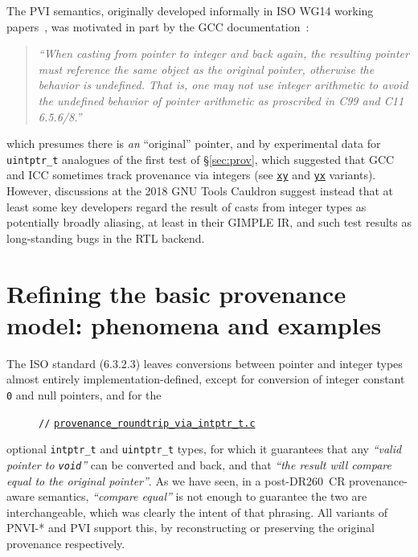 \documentclass[acmsmall,review,screen]{acmart}\settopmatter{printfolios=true,printccs=false,printacmref=false}
\newcommand{\myparagraph}[1]{\vspace{0.5\baselineskip}\par\noindent{\normalsize\bfseries{#1}}\quad}
\newcommand{\mytesturl}[1]{https://cerberus.cl.cam.ac.uk/cerberus?defacto/#1}
\newcommand{\mytestlink}[2]{\href{\mytesturl{#1}}{#2}}
\newcommand{\mylsttestlink}[1]{\mytestlink{#1}{\lstinline{#1}}}
\newcommand{\mylistingmargin}{5mm}
\newcommand{\myfooexamplename}[1]{\mylsttestlink{#1}}
\newcommand{\myfooexample}[3]{{\vspace*{-0.5\baselineskip}\par{\noindent\small\hspace*{\mylistingmargin}\lstinline{//} \mylsttestlink{#2}\vspace*{0.25\baselineskip}\par}}}
\begin{document}
The PVI semantics, originally developed
informally in ISO WG14 working papers~\cite{N2090,N2263}, 
was motivated in part by 
the GCC documentation~\cite{gcc-arrays}:
\begin{quote}
\emph{``When casting from pointer to integer and back again, the
    resulting pointer must reference the same object as the original
    pointer, otherwise the behavior is undefined. That is, one may
    not use integer arithmetic to avoid the undefined behavior of
    pointer arithmetic as proscribed in C99 and C11 6.5.6/8.''}
\end{quote}
which presumes there is \emph{an} ``original'' pointer, and by experimental data for 
\lstinline{uintptr_t} analogues of the first test of \S\ref{sec:prov},
which suggested that GCC and ICC sometimes track provenance via
integers
(see \mytestlink{provenance_basic_using_uintptr_t_global_xy.c}{\lstinline{xy}} and
\mytestlink{provenance_basic_using_uintptr_t_global_yx.c}{\lstinline{yx}}
variants). 
However, discussions at the 2018 GNU Tools Cauldron suggest instead
that at least some key developers regard
the result of casts from integer types as potentially broadly
aliasing, at least in their GIMPLE IR, and such test results as long-standing
bugs in the RTL backend.


\newpage

\section{Refining the basic provenance model: phenomena and examples}

\myparagraph{Pointer/integer casts}
The ISO standard (6.3.2.3) leaves conversions between pointer and integer types
almost entirely implementation-defined, except for conversion of
integer constant \texttt{0} and null pointers, and for the
\begin{figure}
{\renewcommand{\mylistingmargin}{0mm}\myfooexample{charon_tests}{provenance_roundtrip_via_intptr_t.c}{}%
}
\vspace*{-2\baselineskip}
\end{figure}
optional \lstinline{intptr_t} and \lstinline{uintptr_t} types, for
which it guarantees that any \emph{``valid pointer to \lstinline{void}''} can
be converted and back, and that \emph{``the result will compare equal to the
original pointer''}.  As we have seen, in a post-DR260~CR
provenance-aware semantics, \emph{``compare equal''} is not enough to
guarantee the two are interchangeable, which was clearly the intent of
that phrasing.  All variants of PNVI-* and PVI  support this, by 
reconstructing or preserving the original provenance respectively.
\end{document}
